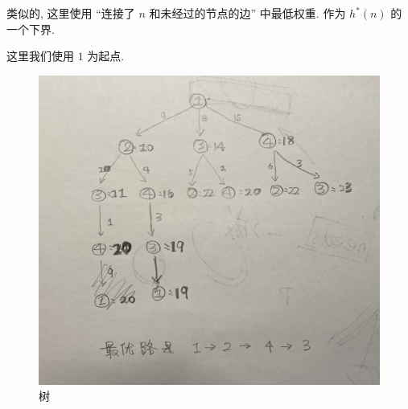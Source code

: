 \documentclass[a4paper, 10pt]{ctexart} %
\begin{document}
类似的, 这里使用 ``连接了 $n$ 和未经过的节点的边'' 中最低权重. 作为 $h^{*}\left(n\right)$ 的一个下界.

这里我们使用 $1$ 为起点. 

\begin{figure}[H]
    \centering
    \includegraphics[scale = 0.5]{IMG_3053 1.jpg}
    \caption[]{树}
\end{figure}
\end{document}
